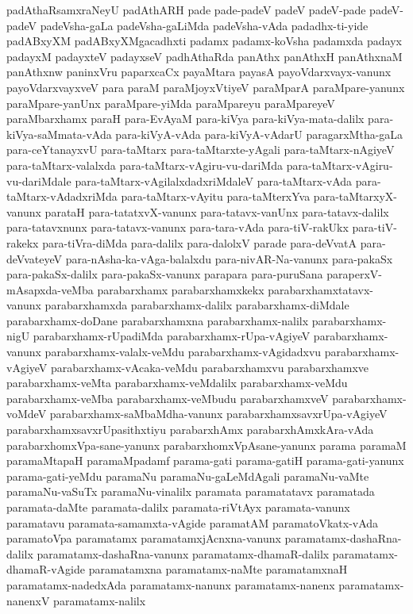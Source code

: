 {padAthaRsamxraNeyU
padAthARH
pade
pade-padeV
padeV
padeV-pade
padeV-padeV
padeVsha-gaLa
padeVsha-gaLiMda
padeVsha-vAda
padadhx-ti-yide
padABxyXM
padABxyXMgacadhxti
padamx
padamx-koVsha
padamxda
padayx
padayxM
padayxteV
padayxseV
padhAthaRda
panAthx
panAthxH
panAthxnaM
panAthxnw
paninxVru
paparxcaCx
payaMtara
payasA
payoVdarxvayx-vanunx
payoVdarxvayxveV
para
paraM
paraMjoyxVtiyeV
paraMparA
paraMpare-yanunx
paraMpare-yanUnx
paraMpare-yiMda
paraMpareyu
paraMpareyeV
paraMbarxhamx
paraH
para-EvAyaM
para-kiVya
para-kiVya-mata-dalilx
para-kiVya-saMmata-vAda
para-kiVyA-vAda
para-kiVyA-vAdarU
paragarxMtha-gaLa
para-ceYtanayxvU
para-taMtarx
para-taMtarxte-yAgali
para-taMtarx-nAgiyeV
para-taMtarx-valalxda
para-taMtarx-vAgiru-vu-dariMda
para-taMtarx-vAgiru-vu-dariMdale
para-taMtarx-vAgilalxdadxriMdaleV
para-taMtarx-vAda
para-taMtarx-vAdadxriMda
para-taMtarx-vAyitu
para-taMterxYva
para-taMtarxyX-vanunx
parataH
para-tatatxvX-vanunx
para-tatavx-vanUnx
para-tatavx-dalilx
para-tatavxnunx
para-tatavx-vanunx
para-tara-vAda
para-tiV-rakUkx
para-tiV-rakekx
para-tiVra-diMda
para-dalilx
para-dalolxV
parade
para-deVvatA
para-deVvateyeV
para-nAsha-ka-vAga-balalxdu
para-nivAR-Na-vanunx
para-pakaSx
para-pakaSx-dalilx
para-pakaSx-vanunx
parapara
para-puruSana
paraperxV-mAsapxda-veMba
parabarxhamx
parabarxhamxkekx
parabarxhamxtatavx-vanunx
parabarxhamxda
parabarxhamx-dalilx
parabarxhamx-diMdale
parabarxhamx-doDane
parabarxhamxna
parabarxhamx-nalilx
parabarxhamx-nigU
parabarxhamx-rUpadiMda
parabarxhamx-rUpa-vAgiyeV
parabarxhamx-vanunx
parabarxhamx-valalx-veMdu
parabarxhamx-vAgidadxvu
parabarxhamx-vAgiyeV
parabarxhamx-vAcaka-veMdu
parabarxhamxvu
parabarxhamxve
parabarxhamx-veMta
parabarxhamx-veMdalilx
parabarxhamx-veMdu
parabarxhamx-veMba
parabarxhamx-veMbudu
parabarxhamxveV
parabarxhamx-voMdeV
parabarxhamx-saMbaMdha-vanunx
parabarxhamxsavxrUpa-vAgiyeV
parabarxhamxsavxrUpasithxtiyu
parabarxhAmx
parabarxhAmxkAra-vAda
parabarxhomxVpa-sane-yanunx
parabarxhomxVpAsane-yanunx
parama
paramaM
paramaMtapaH
paramaMpadamf
parama-gati
parama-gatiH
parama-gati-yanunx
parama-gati-yeMdu
paramaNu
paramaNu-gaLeMdAgali
paramaNu-vaMte
paramaNu-vaSuTx
paramaNu-vinalilx
paramata
paramatatavx
paramatada
paramata-daMte
paramata-dalilx
paramata-riVtAyx
paramata-vanunx
paramatavu
paramata-samamxta-vAgide
paramatAM
paramatoVkatx-vAda
paramatoVpa
paramatamx
paramatamxjAcnxna-vanunx
paramatamx-dashaRna-dalilx
paramatamx-dashaRna-vanunx
paramatamx-dhamaR-dalilx
paramatamx-dhamaR-vAgide
paramatamxna
paramatamx-naMte
paramatamxnaH
paramatamx-nadedxAda
paramatamx-nanunx
paramatamx-nanenx
paramatamx-nanenxV
paramatamx-nalilx
}
